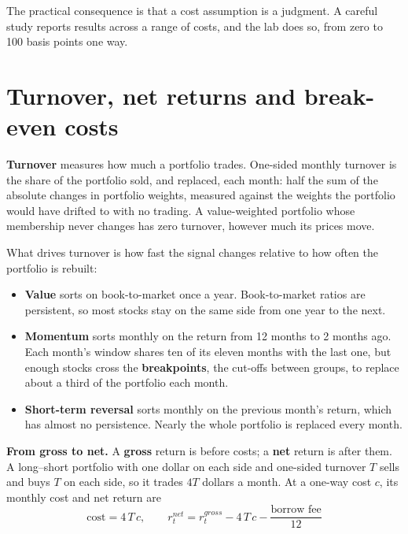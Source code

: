 The practical consequence is that a cost assumption is a judgment. A careful study reports results across a range of costs, and the lab does so, from zero to 100 basis points one way.

\section{Turnover, net returns and break-even costs}
\label{sec:06-turnover}

\textbf{Turnover} measures how much a portfolio trades. One-sided monthly turnover is the share of the portfolio sold, and replaced, each month: half the sum of the absolute changes in portfolio weights, measured against the weights the portfolio would have drifted to with no trading. A value-weighted portfolio whose membership never changes has zero turnover, however much its prices move.

What drives turnover is how fast the signal changes relative to how often the portfolio is rebuilt:

\begin{itemize}
  \item \textbf{Value} sorts on book-to-market once a year. Book-to-market ratios are persistent, so most stocks stay on the same side from one year to the next.
  \item \textbf{Momentum} sorts monthly on the return from 12 months to 2 months ago. Each month's window shares ten of its eleven months with the last one, but enough stocks cross the \textbf{breakpoints}, the cut-offs between groups, to replace about a third of the portfolio each month.
  \item \textbf{Short-term reversal} sorts monthly on the previous month's return, which has almost no persistence. Nearly the whole portfolio is replaced every month.
\end{itemize}

\textbf{From gross to net.} A \textbf{gross} return is before costs; a \textbf{net} return is after them. A long--short portfolio with one dollar on each side and one-sided turnover $T$ sells and buys $T$ on each side, so it trades $4T$ dollars a month. At a one-way cost $c$, its monthly cost and net return are
\begin{equation}
  \text{cost} = 4\,T\,c, \qquad r^{net}_t = r^{gross}_t - 4\,T\,c - \frac{\text{borrow fee}}{12}
  \label{eq:06-net}
\end{equation}

